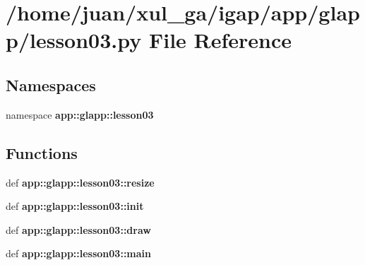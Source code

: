\section{/home/juan/xul\_\-ga/igap/app/glapp/lesson03.py File Reference}
\label{lesson03_8py}
\subsection*{Namespaces}
\begin{CompactItemize}
\item 
namespace {\bf app::glapp::lesson03}
\end{CompactItemize}
\subsection*{Functions}
\begin{CompactItemize}
\item 
def {\bf app::glapp::lesson03::resize}
\item 
def {\bf app::glapp::lesson03::init}
\item 
def {\bf app::glapp::lesson03::draw}
\item 
def {\bf app::glapp::lesson03::main}
\end{CompactItemize}
